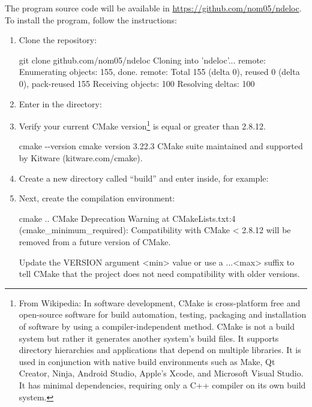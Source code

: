 \documentclass[a4paper,11pt,openany]{memoir}
\begin{document}
The program source code will be available in \url{https://github.com/nom05/ndeloc}. To install the program, follow the instructions:
\begin{enumerate}
	\item Clone the repository:
		\begin{consola}{git clone github.com/nom05/ndeloc}
Cloning into 'ndeloc'...
remote: Enumerating objects: 155, done.
remote: Total 155 (delta 0), reused 0 (delta 0), pack-reused 155
Receiving objects: 100%
Resolving deltas: 100%
\end{consola}
	\item Enter in the directory:
	\item Verify your current CMake version\footnote{From Wikipedia: In software development, CMake is cross-platform free and open-source software for build automation, testing, packaging and installation of software by using a compiler-independent method. CMake is not a build system but rather it generates another system's build files. It supports directory hierarchies and applications that depend on multiple libraries. It is used in conjunction with native build environments such as Make, Qt Creator, Ninja, Android Studio, Apple's Xcode, and Microsoft Visual Studio. It has minimal dependencies, requiring only a C++ compiler on its own build system.} is equal or greater than 2.8.12.
		\begin{consola}{cmake -{}-version}
cmake version 3.22.3
CMake suite maintained and supported by Kitware (kitware.com/cmake).
\end{consola}
	\item Create a new directory called ``build'' and enter inside, for example:
	\item Next, create the compilation environment:
		\begin{consola}{cmake ..}
CMake Deprecation Warning at CMakeLists.txt:4 (cmake_minimum_required):
Compatibility with CMake < 2.8.12 will be removed from a future version of
CMake.

Update the VERSION argument <min> value or use a ...<max> suffix to tell
CMake that the project does not need compatibility with older versions.



\end{consola}
\end{enumerate}
\end{document}
